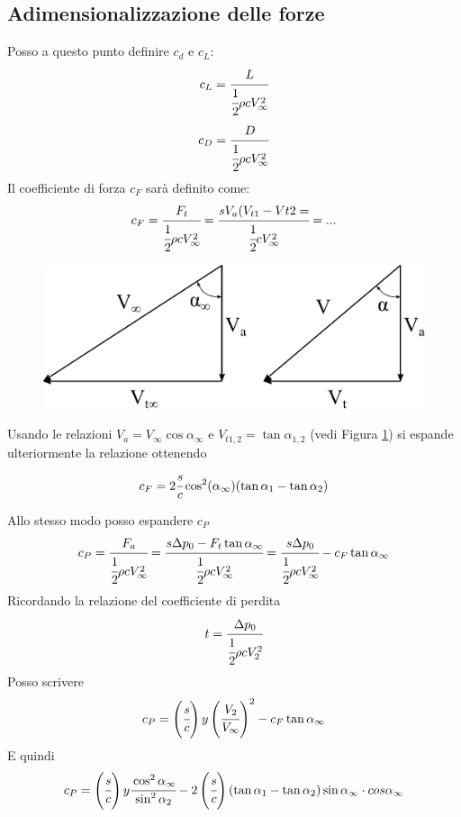 \subsection{Adimensionalizzazione delle forze}
Posso a questo punto definire $c_d$ e $c_L$:
\begin{equation}
c_L = \cfrac{L}{\cfrac{1}{2} \rho c V_{\infty}^2}
\end{equation}
\begin{equation}
c_D = \cfrac{D}{\cfrac{1}{2} \rho c V_{\infty}^2}
\end{equation}
Il coefficiente di forza $c_F$ sarà definito come:
\begin{align*}
c_F = \cfrac{F_t}{\cfrac{1}{2} \rho c V_{\infty}^2} = \cfrac{s V_a (V_{t1}-V{t2}=}{\cfrac{1}{2} c V_{\infty}^2} = ...
\end{align*}
\begin{figure}
\centering
  \includegraphics[width=.4\textwidth]{fig/trigrel.pdf}
\caption{}
\label{fig:trigrel}
\end{figure}
Usando le relazioni $V_a = V_{\infty} \cos \alpha_{\infty}$ e $V_{t1,2} = \tan \alpha_{1,2}$ (vedi Figura \ref{fig:trigrel}) si espande ulteriormente la relazione ottenendo
\begin{equation}
c_F = 2 \cfrac{s}{c} \cos ^ 2 (\alpha_{\infty})(\tan \alpha_1 - \tan \alpha_2)
\end{equation}

Allo stesso modo posso espandere $c_P$
\begin{equation}
c_P = \cfrac{F_a}{\cfrac{1}{2} \rho c V_{\infty}^2} = \cfrac{s \Delta p_0 - F_t \tan \alpha_{\infty}}{\cfrac{1}{2} \rho c V_{\infty}^2} = \cfrac{s \Delta p_0}{\cfrac{1}{2} \rho c V_{\infty}^2} - c_F \tan \alpha_{\infty}
\end{equation}
Ricordando la relazione del coefficiente di perdita
\begin{align*}
t = \cfrac{\Delta p_0}{\cfrac{1}{2} \rho c V_2^2}
\end{align*}
Posso scrivere
\begin{align*}
c_P = \left(\cfrac{s}{c}\right)y \left(\cfrac{V_2}{V_{\infty}}\right)^2 - c_F \tan \alpha_{\infty}
\end{align*}
E quindi
\begin{equation}
c_P = \left(\cfrac{s}{c}\right)y \cfrac{\cos^2 \alpha_{\infty}}{\sin^2 \alpha_2} -2\left(\cfrac{s}{c}\right) \left(\tan \alpha_1 - \tan \alpha_2 \right) \sin \alpha_{\infty} \cdot cos \alpha_{\infty}
\end{equation}

